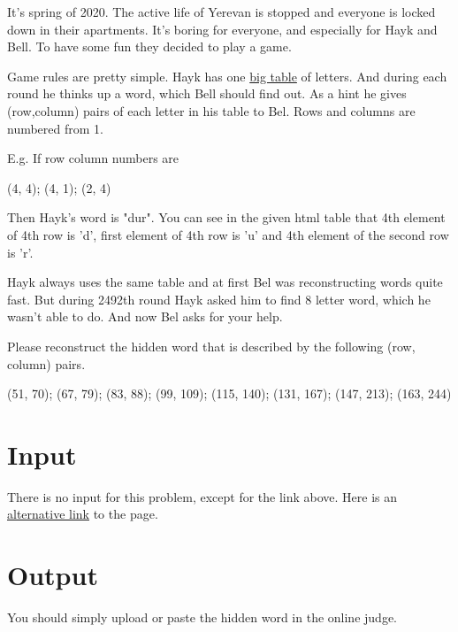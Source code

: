 It's spring of 2020.
The active life of Yerevan is stopped and everyone is locked down in their apartments.
It's boring for everyone, and especially for Hayk and Bell. 
To have some fun they decided to play a game.

Game rules are pretty simple.
Hayk has one \href{http://ejudge.rau.am/ejudge/hayktable.html}{big table} of letters. And during each round he thinks up a word, which Bell should find out. As a hint he gives (row,column) pairs of each letter in his table to Bel.
Rows and columns are numbered from 1.

E.g. If row column numbers are

(4, 4); (4, 1); (2, 4)


Then Hayk's word is "dur".
You can see in the given html table that 4th element of 4th row is 'd', first element of 4th row is 'u' and 4th element of the second row is 'r'.

Hayk always uses the same table and at first Bel was reconstructing words quite fast.
But during 2492th round Hayk asked him to find 8 letter word, which he wasn't able to do.
And now Bel asks for your help.

Please reconstruct the hidden word that is described by the following (row, column) pairs.

(51, 70); (67, 79); (83, 88); (99, 109); (115, 140); (131, 167); (147, 213); (163, 244)

\section*{Input}
There is no input for this problem, except for the link above.
Here is an \href{http://167.71.248.201/ejudge/hayktable.html}{alternative link} to the page.

\section*{Output}
You should simply upload or paste the hidden word in the online judge. 